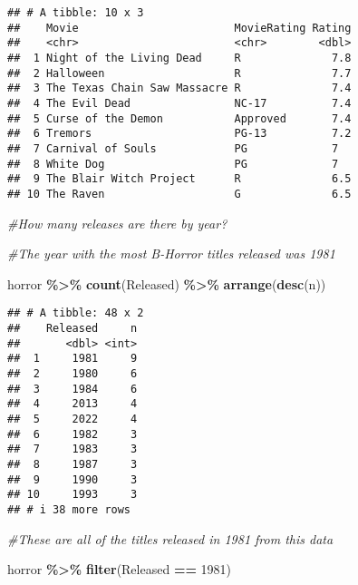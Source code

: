 \documentclass[
]{article}
\newenvironment{Shaded}{\begin{snugshade}}{\end{snugshade}}
\newcommand{\CommentTok}[1]{\textcolor[rgb]{0.56,0.35,0.01}{\textit{#1}}}
\newcommand{\DecValTok}[1]{\textcolor[rgb]{0.00,0.00,0.81}{#1}}
\newcommand{\FunctionTok}[1]{\textcolor[rgb]{0.13,0.29,0.53}{\textbf{#1}}}
\newcommand{\NormalTok}[1]{#1}
\newcommand{\SpecialCharTok}[1]{\textcolor[rgb]{0.81,0.36,0.00}{\textbf{#1}}}
\begin{document}
\begin{verbatim}
## # A tibble: 10 x 3
##    Movie                        MovieRating Rating
##    <chr>                        <chr>        <dbl>
##  1 Night of the Living Dead     R              7.8
##  2 Halloween                    R              7.7
##  3 The Texas Chain Saw Massacre R              7.4
##  4 The Evil Dead                NC-17          7.4
##  5 Curse of the Demon           Approved       7.4
##  6 Tremors                      PG-13          7.2
##  7 Carnival of Souls            PG             7  
##  8 White Dog                    PG             7  
##  9 The Blair Witch Project      R              6.5
## 10 The Raven                    G              6.5
\end{verbatim}

\begin{Shaded}
\begin{Highlighting}[]
\CommentTok{\#How many releases are there by year? }

\CommentTok{\#The year with the most B{-}Horror titles released was 1981}

\NormalTok{horror }\SpecialCharTok{\%\textgreater{}\%} 
  \FunctionTok{count}\NormalTok{(Released) }\SpecialCharTok{\%\textgreater{}\%} 
  \FunctionTok{arrange}\NormalTok{(}\FunctionTok{desc}\NormalTok{(n))}
\end{Highlighting}
\end{Shaded}

\begin{verbatim}
## # A tibble: 48 x 2
##    Released     n
##       <dbl> <int>
##  1     1981     9
##  2     1980     6
##  3     1984     6
##  4     2013     4
##  5     2022     4
##  6     1982     3
##  7     1983     3
##  8     1987     3
##  9     1990     3
## 10     1993     3
## # i 38 more rows
\end{verbatim}

\begin{Shaded}
\begin{Highlighting}[]
\CommentTok{\#These are all of the titles released in 1981 from this data}

\NormalTok{horror }\SpecialCharTok{\%\textgreater{}\%} 
  \FunctionTok{filter}\NormalTok{(Released }\SpecialCharTok{==} \DecValTok{1981}\NormalTok{)}
\end{Highlighting}
\end{Shaded}
\end{document}
